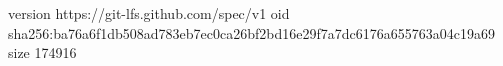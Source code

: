 version https://git-lfs.github.com/spec/v1
oid sha256:ba76a6f1db508ad783eb7ec0ca26bf2bd16e29f7a7dc6176a655763a04c19a69
size 174916
